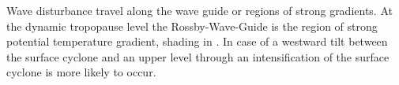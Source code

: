 Wave disturbance travel along the wave guide or regions of strong gradients. At the dynamic tropopause level the Rossby-Wave-Guide is the region of strong potential temperature gradient, shading in  \citep{nielsen-gammon_visualization_2001}.
In case of a westward tilt between the surface cyclone and an upper level through an intensification of the surface cyclone is more likely to occur.




% 
